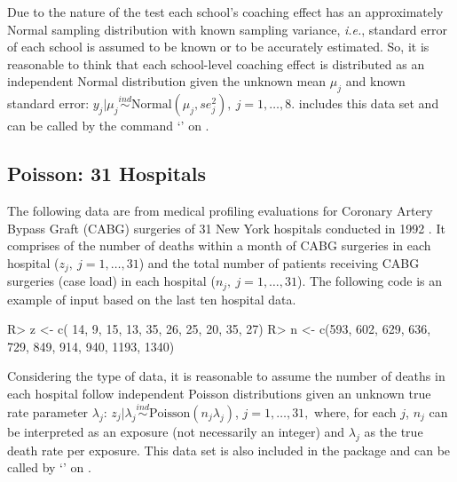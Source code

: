\documentclass[article]{jss}
\begin{document}
Due to the nature of the test each school's coaching effect has an approximately Normal sampling distribution with known sampling variance, \emph{i.e.}, standard error of each school is assumed to be known or to be accurately estimated. So, it is reasonable to think that each school-level coaching effect is distributed as an independent Normal distribution given the unknown mean $\mu_{j}$ and known standard error:  $y_{j}\vert\mu_{j}\stackrel{ind}{\sim} \textrm{Normal}(\mu_{j}, se^{2}_{j}),~ j=1, \ldots, 8$.  includes this data set and can be called by the command `' on .

\subsection{Poisson: 31 Hospitals}
The following data are from medical profiling evaluations for Coronary Artery Bypass Graft (CABG) surgeries of 31 New York hospitals conducted in 1992 \cite{2012}. It comprises of the number of deaths within a month of CABG surgeries in each hospital ($z_{j},~j=1, \ldots, 31$) and the total number of patients receiving CABG surgeries (case load) in each hospital ($n_{j},~j=1, \ldots, 31$). The following code is an example of input based on the last ten hospital data.
\begin{CodeChunk}
\begin{CodeInput}
R> z <- c( 14,   9,  15,  13,  35,  26,  25,  20,   35,   27)
R> n <- c(593, 602, 629, 636, 729, 849, 914, 940, 1193, 1340)
\end{CodeInput}
\end{CodeChunk}
Considering the type of data, it is reasonable to assume the number of deaths in each hospital follow independent Poisson distributions given an unknown true rate parameter $\lambda_{j}$: $z_{j}\vert \lambda_{j}\stackrel{ind}{\sim} \textrm{Poisson}(n_{j}\lambda_{j})$, $j=1, \ldots, 31,$ where, for each $j$, $n_{j}$ can be interpreted as an exposure (not necessarily an integer) and $\lambda_{j}$ as the true death rate per exposure. This data set is also included in the package and can be called by `' on .
\end{document}
